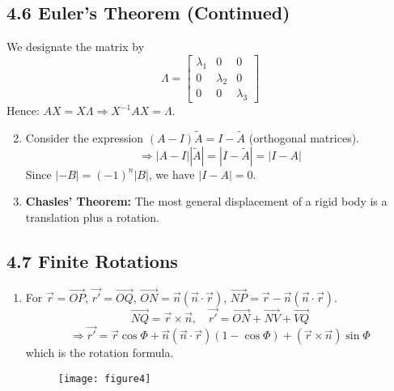 \documentclass{article}
\begin{document}
	\subsection*{4.6 Euler's Theorem (Continued)}
	We designate the matrix by
	\[
	\Lambda = 
	\begin{bmatrix}
		\lambda_1 & 0 & 0 \\
		0 & \lambda_2 & 0 \\
		0 & 0 & \lambda_3
	\end{bmatrix}
	\]
	Hence: $AX = X\Lambda \Rightarrow X^{-1}AX = \Lambda$.
	\begin{enumerate}
		\setcounter{enumi}{1}
		\item Consider the expression $(A-I)\tilde{A} = I - \tilde{A}$ (orthogonal matrices).
		\[
		\Rightarrow |A-I||\tilde{A}| = |I-\tilde{A}| = |I-A|
		\]
		Since $|-B| = (-1)^n |B|$, we have $|I-A| = 0$.
		
		\item \textbf{Chasles' Theorem:} The most general displacement of a rigid body is a translation plus a rotation.
	\end{enumerate}
	
	\subsection*{4.7 Finite Rotations}
	\begin{enumerate}
		\item For $\vec{r} = \vec{OP}$, $\vec{r'} = \vec{OQ}$, $\vec{ON} = \vec{n}(\vec{n} \cdot \vec{r})$, $\vec{NP} = \vec{r} - \vec{n}(\vec{n} \cdot \vec{r})$.
		\[
		\vec{NQ} = \vec{r} \times \vec{n}, \quad \vec{r'} = \vec{ON} + \vec{NV} + \vec{VQ}
		\]
		\[
		\Rightarrow \vec{r'} = \vec{r}\cos\Phi + \vec{n}(\vec{n} \cdot \vec{r})(1-\cos\Phi) + (\vec{r} \times \vec{n})\sin\Phi
		\]
		which is the rotation formula.
		
		\begin{figure}[h]
			\centering
			\texttt{[image: figure4]}
			\caption{}
			\label{fig:figure4}
		\end{figure}
		
	\end{enumerate}
	
\end{document}
